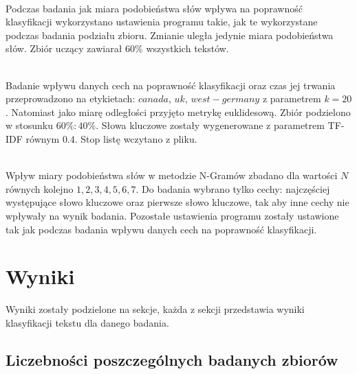 \documentclass{classrep}
\begin{document}
\\Podczas badania jak miara podobieństwa słów wpływa na poprawność klasyfikacji wykorzystano ustawienia
programu takie, jak te wykorzystane podczas badania podziału zbioru. Zmianie uległa jedynie miara podobieństwa słów.
Zbiór uczący zawiarał $60\%$ wszystkich tekstów.

\\Badanie wpływu danych cech na poprawność klasyfikacji oraz czas jej trwania przeprowadzono na
etykietach: $canada$, $uk$, $west-germany$ z parametrem $k=20$. Natomiast jako miarę odległości
przyjęto metrykę euklidesową. Zbiór podzielono w stosunku $60\%:40\%$. Słowa kluczowe zostały wygenerowane
z parametrem TF-IDF równym $0.4$. Stop listę wczytano z pliku.

\\Wpływ miary podobieństwa słów w metodzie N-Gramów zbadano dla wartości $N$ równych kolejno ${1,2,3,4,5,6,7}$.
Do badania wybrano tylko cechy: najczęściej występujące słowo kluczowe oraz pierwsze słowo kluczowe, tak
aby inne cechy nie wpływały na wynik badania. Pozostałe ustawienia programu zostały ustawione tak jak podczas badania wpływu danych cech na
poprawność klasyfikacji.





\section{Wyniki}
Wyniki zostały podzielone na sekcje, każda z sekcji przedstawia wyniki klasyfikacji tekstu
dla danego badania.
\subsection{Liczebności poszczególnych badanych zbiorów}
\end{document}
